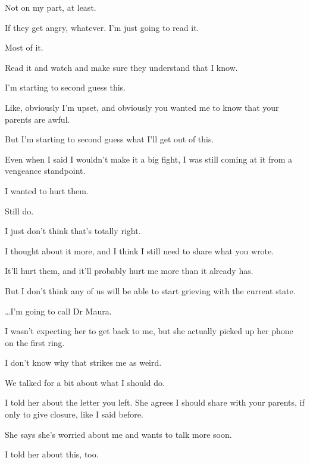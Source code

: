 {
Not on my part, at least.

If they get angry, whatever. I'm
just going to read it.

Most of it.

Read it and watch and make sure
they understand that I know.

I'm starting to second guess this.

Like, obviously I'm upset, and
obviously you wanted me to know that your parents are awful.

But I'm starting to second guess
what I'll get out of this.

Even when I said I wouldn't make it
a big fight, I was still coming at it from a vengeance standpoint.

I wanted to hurt them.

Still do.

I just don't think that's totally
right.

I thought about it more, and I think
I still need to share what you wrote.

It'll hurt them, and it'll probably
hurt me more than it already has.

But I don't think any of us will be
able to start grieving with the current state.

\ldots{}I'm going to call Dr Maura.

I wasn't expecting her to get back
to me, but she actually picked up her phone on the first ring.

I don't know why that strikes me as
weird.

We talked for a bit about what I
should do.

I told her about the letter you
left. She agrees I should share with your parents, if only to give
closure, like I said before.

She says she's worried about me and
wants to talk more soon.

I told her about this, too.

}
